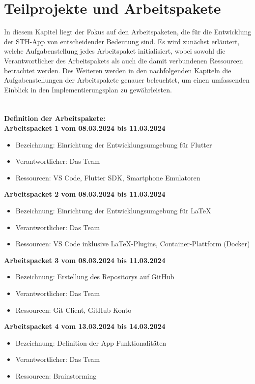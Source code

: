 \chapter{Teilprojekte und Arbeitspakete}
In diesem Kapitel liegt der Fokus auf den Arbeitspaketen, die für die Entwicklung der STH-App von entscheidender Bedeutung sind. Es wird zunächst erläutert, welche Aufgabenstellung jedes Arbeitspaket initialisiert, wobei sowohl die Verantwortlicher des Arbeitspakets als auch die damit verbundenen Ressourcen betrachtet werden.
Des Weiteren werden in den nachfolgenden Kapiteln die Aufgabenstellungen der Arbeitspakete genauer beleuchtet, um einen umfassenden Einblick in den Implementierungsplan zu gewährleisten.
\\
\\
\\
\textbf{Definition der Arbeitspakete:} \\

\textbf{Arbeitspacket 1 vom 08.03.2024 bis 11.03.2024}
\begin{itemize}[itemsep=0pt]
    \item{Bezeichnung: Einrichtung der Entwicklungsumgebung für Flutter}
    \item{Verantwortlicher: Das Team} 
    \item{Ressourcen: VS Code, Flutter SDK, Smartphone Emulatoren} 
\end{itemize} 

\textbf{Arbeitspacket 2 vom 08.03.2024 bis 11.03.2024}
\begin{itemize}[itemsep=0pt]
	\item{Bezeichnung: Einrichtung der Entwicklungsumgebung für LaTeX}
	\item{Verantwortlicher: Das Team} 
	\item{Ressourcen: VS Code inklusive LaTeX-Plugins, Container-Plattform (Docker)} 
\end{itemize}

\textbf{Arbeitspacket 3 vom 08.03.2024 bis 11.03.2024}
\begin{itemize}[itemsep=0pt]
	\item{Bezeichnung: Erstellung des Repositorys auf GitHub}
	\item{Verantwortlicher: Das Team} 
	\item{Ressourcen: Git-Client, GitHub-Konto} 
\end{itemize}

\textbf{Arbeitspacket 4 vom 13.03.2024 bis 14.03.2024}
\begin{itemize}[itemsep=0pt]
	\item{Bezeichnung: Definition der App Funktionalitäten}
	\item{Verantwortlicher: Das Team} 
	\item{Ressourcen: Brainstorming} 
\end{itemize} 

